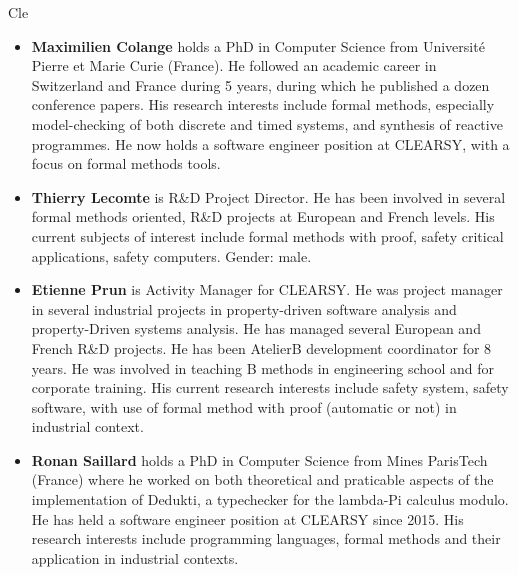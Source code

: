 \begin{sitedescription}{Cle}
\begin{itemize}
\item\textbf{Maximilien Colange} holds a PhD in Computer Science from Université Pierre et Marie Curie (France). He followed an 
academic career in Switzerland and France during 5 years, during which he published a dozen conference papers. His research interests
include formal methods, especially model-checking of both discrete and timed systems, and synthesis of reactive programmes. He now holds 
a software engineer position at CLEARSY, with a focus on formal methods tools.

\item\textbf{Thierry Lecomte} is R\&D Project Director. He has been involved in several formal methods oriented, R\&D projects at European 
and French levels. His current subjects of interest include formal methods with proof, safety critical applications, safety computers. 
Gender: male.

\item\textbf{Etienne Prun} is Activity Manager for CLEARSY. He was project manager in several industrial projects in property-driven 
software analysis and property-Driven systems analysis. He has managed several European and French R\&D projects. He has been AtelierB 
development coordinator for 8 years. He was involved in teaching B methods in engineering school and for corporate training. His current 
research interests include safety system, safety software, with use of formal method with proof (automatic or not) in industrial 
context.

\item\textbf{Ronan Saillard} holds a PhD in Computer Science from Mines ParisTech (France) where he worked on both theoretical and praticable 
aspects of the implementation of Dedukti, a typechecker for the lambda-Pi calculus modulo. He has held a software engineer position at 
CLEARSY since 2015. His research interests include programming languages, formal methods and their application in industrial contexts.
\end{itemize}

\end{sitedescription}

